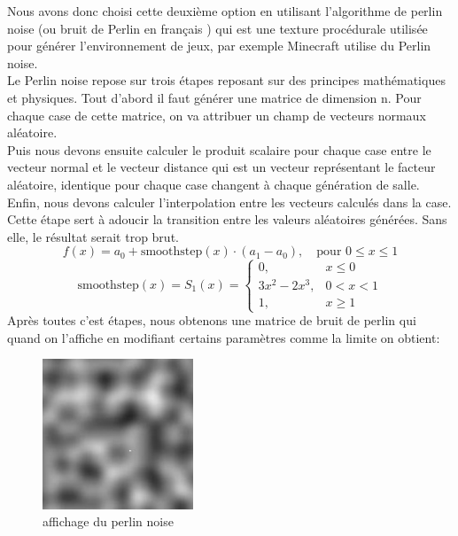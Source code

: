 \documentclass[a4paper,11pt]{article}
\begin{document}
Nous avons donc choisi cette deuxième option en utilisant l'algorithme de perlin noise (ou bruit de Perlin en français ) qui est une texture procédurale  utilisée pour générer l'environnement de jeux, par exemple Minecraft utilise du Perlin noise.\\
Le Perlin noise repose sur trois étapes reposant sur des principes mathématiques et physiques. Tout d'abord il faut générer une matrice de dimension n. Pour chaque case de cette matrice, on va attribuer un champ de vecteurs normaux aléatoire.\\
Puis nous devons ensuite calculer le produit scalaire pour chaque case entre le vecteur normal et le vecteur distance qui est un vecteur représentant le facteur aléatoire, identique pour chaque case changent à chaque génération de salle.\\
Enfin, nous devons calculer l'interpolation entre les vecteurs calculés dans la case. Cette étape sert à adoucir la transition entre les valeurs aléatoires générées. Sans elle, le résultat serait trop brut.\\
\[
f(x) = a_{0} + \text{smoothstep}(x) \cdot (a_{1} - a_{0}), \quad \text{pour } 0 \leq x \leq 1
\]
\begin{equation*}
\text{smoothstep}(x) =
S_1(x) =
\begin{cases} 
0, & x \leq 0 \\ 
3x^2 - 2x^3, & 0 < x < 1 \\ 
1, & x \geq 1
\end{cases}
\end{equation*}
Après toutes c'est étapes, nous obtenons une matrice de bruit de perlin qui quand on l'affiche en modifiant certains paramètres comme la limite on obtient:\
\begin{figure}[ht]
\centering
\includegraphics[width=0.4\textwidth]{./img/perlin.jpg}
\caption{affichage du perlin noise}
\label{fig:affichage perlin}
\end{figure}
\\\\
\end{document}
